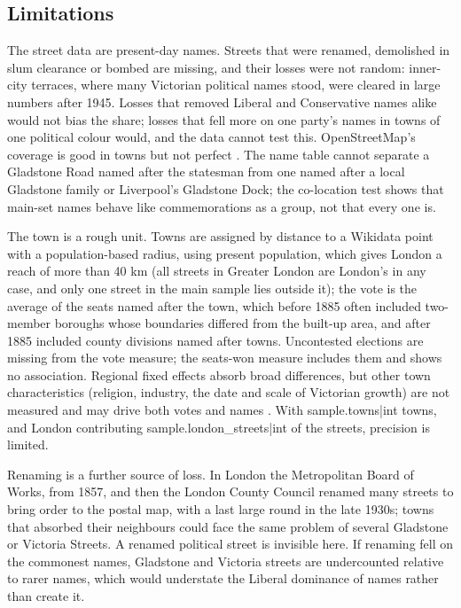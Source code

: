\documentclass[11pt,a4paper]{article}
\begin{document}
\subsection{Limitations}
The street data are present-day names. Streets that were renamed, demolished in slum clearance or bombed are missing, and their losses were not random: inner-city terraces, where many Victorian political names stood, were cleared in large numbers after 1945. Losses that removed Liberal and Conservative names alike would not bias the share; losses that fell more on one party's names in towns of one political colour would, and the data cannot test this. OpenStreetMap's coverage is good in towns but not perfect \citep{haklay2010}. The name table cannot separate a Gladstone Road named after the statesman from one named after a local Gladstone family or Liverpool's Gladstone Dock; the co-location test shows that main-set names behave like commemorations as a group, not that every one is.

The town is a rough unit. Towns are assigned by distance to a Wikidata point with a population-based radius, using present population, which gives London a reach of more than 40 km (all streets in Greater London are London's in any case, and only one street in the main sample lies outside it); the vote is the average of the seats named after the town, which before 1885 often included two-member boroughs whose boundaries differed from the built-up area, and after 1885 included county divisions named after towns. Uncontested elections are missing from the vote measure; the seats-won measure includes them and shows no association. Regional fixed effects absorb broad differences, but other town characteristics (religion, industry, the date and scale of Victorian growth) are not measured and may drive both votes and names \citep{wald1983,pelling1967}. With {{sample.towns|int}} towns, and London contributing {{sample.london_streets|int}} of the streets, precision is limited.

Renaming is a further source of loss. In London the Metropolitan Board of Works, from 1857, and then the London County Council renamed many streets to bring order to the postal map, with a last large round in the late 1930s; towns that absorbed their neighbours could face the same problem of several Gladstone or Victoria Streets. A renamed political street is invisible here. If renaming fell on the commonest names, Gladstone and Victoria streets are undercounted relative to rarer names, which would understate the Liberal dominance of names rather than create it.
\end{document}

